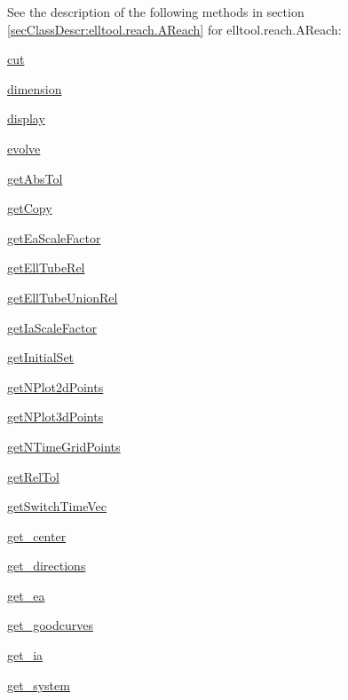 See the description of the following methods in section \ref{secClassDescr:elltool.reach.AReach}
 for elltool.reach.AReach:

\begin{list}{}{}
 \item \hyperref[method:elltool.reach.AReach.cut]{cut}
 \item \hyperref[method:elltool.reach.AReach.dimension]{dimension}
 \item \hyperref[method:elltool.reach.AReach.display]{display}
 \item \hyperref[method:elltool.reach.AReach.evolve]{evolve}
 \item \hyperref[method:elltool.reach.AReach.getAbsTol]{getAbsTol}
 \item \hyperref[method:elltool.reach.AReach.getCopy]{getCopy}
 \item \hyperref[method:elltool.reach.AReach.getEaScaleFactor]{getEaScaleFactor}
 \item \hyperref[method:elltool.reach.AReach.getEllTubeRel]{getEllTubeRel}
 \item \hyperref[method:elltool.reach.AReach.getEllTubeUnionRel]{getEllTubeUnionRel}
 \item \hyperref[method:elltool.reach.AReach.getIaScaleFactor]{getIaScaleFactor}
 \item \hyperref[method:elltool.reach.AReach.getInitialSet]{getInitialSet}
 \item \hyperref[method:elltool.reach.AReach.getNPlot2dPoints]{getNPlot2dPoints}
 \item \hyperref[method:elltool.reach.AReach.getNPlot3dPoints]{getNPlot3dPoints}
 \item \hyperref[method:elltool.reach.AReach.getNTimeGridPoints]{getNTimeGridPoints}
 \item \hyperref[method:elltool.reach.AReach.getRelTol]{getRelTol}
 \item \hyperref[method:elltool.reach.AReach.getSwitchTimeVec]{getSwitchTimeVec}
 \item \hyperref[method:elltool.reach.AReach.get_center]{get\_center}
 \item \hyperref[method:elltool.reach.AReach.get_directions]{get\_directions}
 \item \hyperref[method:elltool.reach.AReach.get_ea]{get\_ea}
 \item \hyperref[method:elltool.reach.AReach.get_goodcurves]{get\_goodcurves}
 \item \hyperref[method:elltool.reach.AReach.get_ia]{get\_ia}
 \item \hyperref[method:elltool.reach.AReach.get_system]{get\_system}

\end{list}
